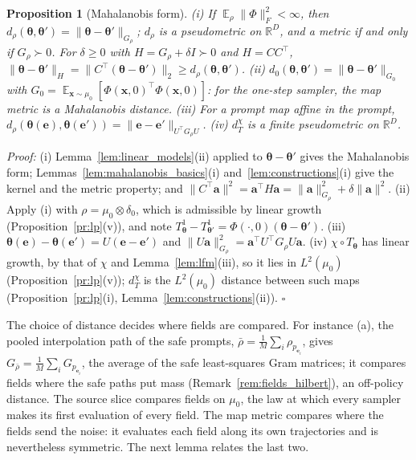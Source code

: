 \documentclass{article}
\DeclareMathOperator{\E}{\mathbb{E}}
\newcommand{\RR}{\mathbb{R}}
\newcommand{\bth}{\boldsymbol{\theta}}
\newcommand{\bx}{\mathbf{x}}
\newcommand{\ba}{\mathbf{a}}
\newcommand{\be}{\mathbf{e}}
\theoremstyle{plain}
\newtheorem{proposition}[theorem]{Proposition}
\theoremstyle{remark}
\begin{document}
\begin{proposition}[Mahalanobis form]\label{pr:mahalanobis}
(i) If $\E_\rho\|\Phi\|_F^2<\infty$, then $d_\rho(\bth,\bth')=\|\bth-\bth'\|_{G_\rho}$; $d_\rho$ is a pseudometric
on $\RR^D$, and a metric if and only if $G_\rho\succ0$. For $\delta\ge0$ with $H=G_\rho+\delta I\succ0$
and $H=CC^\top$, $\|\bth-\bth'\|_H=\|C^\top(\bth-\bth')\|_2\ge d_\rho(\bth,\bth')$.
(ii) $d_0(\bth,\bth')=\|\bth-\bth'\|_{G_0}$ with $G_0=\E_{\bx\sim\mu_0}[\Phi(\bx,0)^\top\Phi(\bx,0)]$: for the one-step
sampler, the map metric is a Mahalanobis distance.
(iii) For a prompt map affine in the prompt, $d_\rho(\bth(\be),\bth(\be'))=\|\be-\be'\|_{U^\top G_\rho U}$.
(iv) $d^\chi_T$ is a finite pseudometric on $\RR^D$.
\end{proposition}
\textit{Proof:}
(i) Lemma~\ref{lem:linear_models}(ii) applied to $\bth-\bth'$ gives the Mahalanobis form; Lemmas~\ref{lem:mahalanobis_basics}(i)
and~\ref{lem:constructions}(i) give the kernel and the metric property; and $\|C^\top\ba\|^2=\ba^\top H\ba=\|\ba\|_{G_\rho}^2+\delta\|\ba\|^2$.
(ii) Apply (i) with $\rho=\mu_0\otimes\delta_0$, which is admissible by linear growth (Proposition~\ref{pr:lp}(v)), and note
$T^1_{\bth}-T^1_{\bth'}=\Phi(\cdot,0)(\bth-\bth')$.
(iii) $\bth(\be)-\bth(\be')=U(\be-\be')$ and $\|U\ba\|^2_{G_\rho}=\ba^\top U^\top G_\rho U\ba$.
(iv) $\chi\circ T_{\bth}$ has linear growth, by that of $\chi$ and Lemma~\ref{lem:lfm}(iii), so it lies in $L^2(\mu_0)$
(Proposition~\ref{pr:lp}(v)); $d^\chi_T$ is the $L^2(\mu_0)$ distance between such maps (Proposition~\ref{pr:lp}(i),
Lemma~\ref{lem:constructions}(ii)). \hfill$\square$

The choice of distance decides where fields are compared. For instance (a), the pooled
interpolation path of the safe prompts, $\bar\rho=\frac1M\sum_i\rho_{p_{\be_i}}$, gives
$G_{\bar\rho}=\frac1M\sum_iG_{p_{\be_i}}$, the average of the safe least-squares Gram matrices; it
compares fields where the safe paths put mass (Remark~\ref{rem:fields_hilbert}), an off-policy distance. The source slice compares
fields on $\mu_0$, the law at which every sampler makes its first evaluation of every field. The map metric
compares where the fields send the noise: it evaluates each field along its own trajectories and
is nevertheless symmetric. The next lemma relates the last two.
\end{document}
